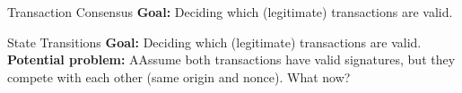 \documentclass[]{beamer}
\begin{document}
\begin{frame}{Transaction Consensus}
\textbf{Goal:} Deciding which (legitimate) transactions are \textcolor{focus}{valid}.\\
\vspace{1em}
\end{frame}

\begin{frame}{State Transitions}
	\textbf{Goal:} Deciding which (legitimate) transactions are \textcolor{focus}{valid}. \\
\vspace{1em}
\textbf{Potential problem:} AAssume both transactions have valid signatures, but they compete with each other (same origin and nonce). What now? \\
\begin{figure}[h!]
	\center
	
\end{figure}


\end{frame}
\end{document}
